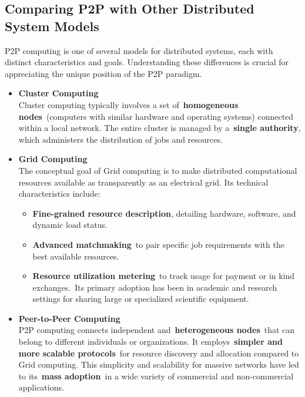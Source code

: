 \documentclass{scrbook}
\begin{document}
\subsection{Comparing P2P with Other Distributed System
Models}\label{comparing-p2p-with-other-distributed-system-models}

P2P computing is one of several models for distributed systems, each
with distinct characteristics and goals. Understanding these differences
is crucial for appreciating the unique position of the P2P paradigm.

\begin{itemize}
    \item
      \textbf{Cluster Computing}\\
      Cluster computing typically involves a set of~\textbf{homogeneous
      nodes}~(computers with similar hardware and operating systems)
      connected within a local network. The entire cluster is managed by
      a~\textbf{single authority}, which administers the distribution of
      jobs and resources.
    \item
      \textbf{Grid Computing}\\
      The conceptual goal of Grid computing is to make distributed       computational resources available as transparently as an electrical grid. Its technical characteristics include:~
    
          \begin{itemize}
          \item
            \textbf{Fine-grained resource description}, detailing hardware, software, and dynamic load status.~
          \item
            \textbf{Advanced matchmaking}~to pair specific job requirements with the best available resources.~
          \item
            \textbf{Resource utilization metering}~to track usage for payment or in kind exchanges.~Its primary adoption has been in academic and research settings for sharing large or specialized scientific equipment.
          \end{itemize}
          
    \item
      \textbf{Peer-to-Peer Computing}\\
      P2P computing connects independent and~\textbf{heterogeneous
      nodes}~that can belong to different individuals or organizations. It employs~\textbf{simpler and more scalable protocols}~for resource discovery and allocation compared to Grid computing. This simplicity and scalability for massive networks have led to its~\textbf{mass adoption}~in a wide variety of commercial and non-commercial applications.
\end{itemize}
\end{document}
